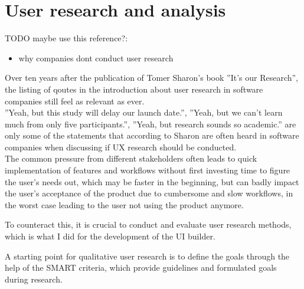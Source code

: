 %
\chapter{User research and analysis}
\label{chap:research}



TODO maybe use this reference?:
\begin{itemize}
  \item \cite{Ross:2016} why companies dont conduct user research
\end{itemize}

Over ten years after the publication of Tomer Sharon's book ''It's our Research'', the listing of qoutes in the introduction about user research in software companies still feel as relevant as ever.
\\
''Yeah, but this study will delay our launch date.'', ''Yeah, but we can't learn much from only five participants.'', ''Yeah, but research sounds so academic.'' \cite[p. 4]{Sharon:2012mk} are only some of the statements that according to Sharon are often heard in software companies when discussing if UX research should be conducted.
\\
The common pressure from different stakeholders often leads to quick implementation of features and workflows without first investing time to figure the user's needs out, which may be faster in the beginning, but can badly impact the user's acceptance of the product due to cumbersome and slow workflows,
in the worst case leading to the user not using the product anymore.

To counteract this, it is crucial to conduct and evaluate user research methods, which is what I did for the development of the UI builder.

A starting point for qualitative user research is to define the goals through the help of the SMART criteria, which provide guidelines and formulated goals during research.

